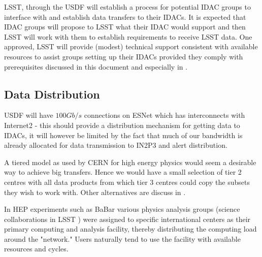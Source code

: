 LSST, through the USDF will establish a process for potential \gls{IDAC} groups to interface with and establish data transfers to their IDACs. It is expected that \gls{IDAC} groups will propose to \gls{LSST} what their \gls{IDAC} would support and then \gls{LSST} will work with them to establish requirements to receive \gls{LSST} data. One approved, \gls{LSST} will provide (modest) technical support consistent with available resources to assist groups setting up their IDACs provided they comply with prerequisites discussed in this document and especially in .

\subsection{Data Distribution} \label{sec:dist}

USDF will have $100Gb/s$ connections  on \gls{ESNet} which has interconnects with Internet2 - this should provide a distribution mechanism for getting data to IDACs, it will however be limited by the fact that much of our bandwidth is already allocated for data transmission to \gls{IN2P3} and alert distribution.

A tiered model as used by \gls{CERN} for high energy physics would seem a desirable way to achieve big transfers. Hence we would have a small selection of tier 2 centres with all data products from which tier 3 centres could copy the subsets they wish to work with.  Other alternatives are discuss in .

In \gls{HEP} experiments such as  BaBar various physics analysis groups (science collaborations in \gls{LSST} ) were assigned to specific international centers as their primary computing and analysis facility, thereby distributing the computing load around the "network." Users naturally tend to use the facility with available resources and cycles.


